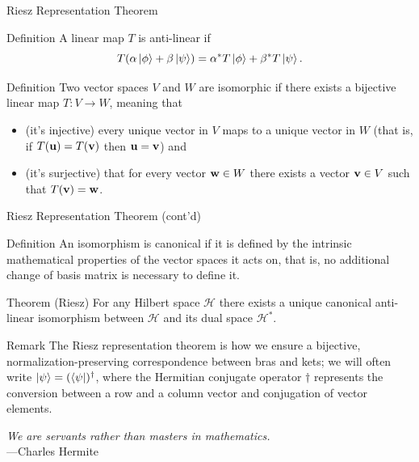 \documentclass{beamer}
\renewcommand{\vec}{\textbf}
\begin{document}
\begin{frame}{Riesz Representation Theorem}


\begin{block}{Definition}
A linear map $T$ is anti-linear if $$T(\alpha\ket\phi + \beta\ket\psi) = \alpha^*T\ket\phi + \beta^*T\ket\psi.$$
\end{block}

\begin{block}{Definition}
Two vector spaces $V$ and $W$ are isomorphic if there exists a bijective linear map $T:V\to W$, meaning that
\begin{itemize}
    \item (it's injective) every unique vector in $V$ maps to a unique vector in $W$ (that is, if $T(\vec u) = T(\vec v)$ then $\vec u = \vec v$) and
    \item  (it's surjective) that for every vector $\vec w \in W$ there exists a vector $\vec v\in V$ such that $T(\vec v) = \vec w$.
\end{itemize}
\end{block}

\end{frame}

\begin{frame}{Riesz Representation Theorem (cont'd)}

\begin{block}{Definition}
An isomorphism is canonical if it is defined by the intrinsic mathematical properties of the vector spaces it acts on, that is, no additional change of basis matrix is necessary to define it.
\end{block}

\begin{block}{Theorem (Riesz)}
For any Hilbert space $\mathcal H$ there exists a unique canonical anti-linear isomorphism between $\mathcal H$ and its dual space $\mathcal H^*$.
\end{block}

\begin{block}{Remark}
The Riesz representation theorem is how we ensure a bijective, normalization-preserving correspondence between bras and kets; we will often write $\ket\psi = (\bra\psi)^\dagger$, where the Hermitian conjugate operator $\dagger$ represents the conversion between a row and a column vector and conjugation of vector elements.
\end{block}

\begin{flushright}
    \textit{We are servants rather than masters in mathematics.}\\---Charles Hermite
\end{flushright}

\end{frame}
\end{document}
